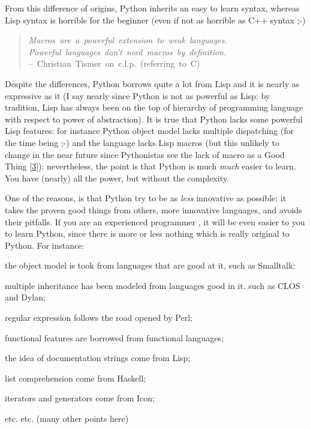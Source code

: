 \documentclass[10pt,english]{article}
\begin{document}
From this difference of origins, Python inherits an easy to learn syntax,
whereas Lisp syntax is horrible for the beginner (even if not as
horrible as C++ syntax ;-)
\begin{quote}
\begin{flushleft}
\emph{Macros~are~a~powerful~extension~to~weak~languages.~\\
Powerful~languages~don't~need~macros~by~definition.}~~\\
--~Christian~Tismer~on~c.l.p.~(referring~to~C)
\end{flushleft}
\end{quote}

Despite the differences, Python borrows quite a lot from Lisp and it
is nearly as expressive as it (I say nearly since Python is 
not as powerful as Lisp: by tradition, Lisp has always been on the top of 
hierarchy of programming language with respect to power of abstraction).
It is true that Python lacks some powerful Lisp features: for instance 
Python object model lacks multiple dispatching (for the time being ;-) 
and the language lacks Lisp macros (but this unlikely to change in the 
near future since Pythonistas see the lack of macro as a Good Thing [\hyperlink{id6}{3}]): 
nevertheless, the point is that Python is much \emph{much} easier to learn. 
You have (nearly) all the power, but without the complexity.

One of the reasons, is that Python
try to be as \emph{less} innovative as
possible: it takes the proven good things from others, more innovative
languages, and avoids their pitfalls. If you are an experienced
programmer , it will be even  easier to you to learn Python, since
there is more or less nothing which is really original to Python.
For instance:
\begin{list}{.}
{
\setlength{\rightmargin}{\leftmargin}
}
\item {} 
the object model is took from languages that are good at it, such
as Smalltalk;

\item {} 
multiple inheritance has been modeled from languages good in it. such
as CLOS and Dylan;

\item {} 
regular expression follows the road opened by Perl;

\item {} 
functional features are borrowed from functional languages;

\item {} 
the idea of documentation strings come from Lisp;

\item {} 
list comprehension come from Haskell;

\item {} 
iterators and generators come from Icon;

\item {} 
etc. etc. (many other points here)

\end{list}
\end{document}

